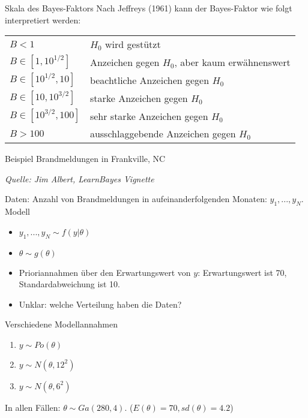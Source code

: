 \documentclass[ignorenonframetext,]{beamer}
\providecommand{\tightlist}{%
\setlength{\itemsep}{0pt}\setlength{\parskip}{0pt}}
\def\labelenumi{\arabic{enumi}.}
\begin{document}
\begin{frame}{Skala des Bayes-Faktors}
Nach Jeffreys (1961) kann der Bayes-Faktor wie folgt interpretiert werden:
\begin{tabular}{ll}
$B<1$ & $H_0$ wird gestützt\\
$B\in [1,10^{1/2}]$ & Anzeichen gegen $H_0$, aber kaum erwähnenswert\\
$B\in [10^{1/2},10]$ & beachtliche Anzeichen gegen $H_0$ \\
$B\in [10,10^{3/2}]$ & starke Anzeichen gegen $H_0$\\
$B\in [10^{3/2},100]$ & sehr starke Anzeichen gegen $H_0$\\
$B>100$ & ausschlaggebende Anzeichen gegen $H_0$
\end{tabular}
\end{frame}

\begin{frame}{Beispiel Brandmeldungen in Frankville, NC}

\emph{Quelle: Jim Albert, LearnBayes Vignette}

Daten: Anzahl von Brandmeldungen in aufeinanderfolgenden Monaten:
\(y_1, ..., y_N\). Modell

\begin{itemize}
\item $y_1, ..., y_N \sim f(y | \theta)$
\item $\theta \sim g(\theta)$
\end{itemize}

\begin{itemize}
\tightlist
\item
  Prioriannahmen über den Erwartungswert von \(y\): Erwartungswert ist
  70, Standardabweichung ist 10.
\item
  Unklar: welche Verteilung haben die Daten?
\end{itemize}

\end{frame}

\begin{frame}{Verschiedene Modellannahmen}

\begin{enumerate}
\def\labelenumi{\arabic{enumi}.}
\tightlist
\item
  \(y \sim Po(\theta)\)
\item
  \(y \sim N(\theta,12^2)\)
\item
  \(y \sim N(\theta, 6^2)\)
\end{enumerate}

In allen Fällen: \(\theta \sim Ga(280, 4)\).
(\(E(\theta)=70, sd(\theta)=4.2\))

\end{frame}
\end{document}
